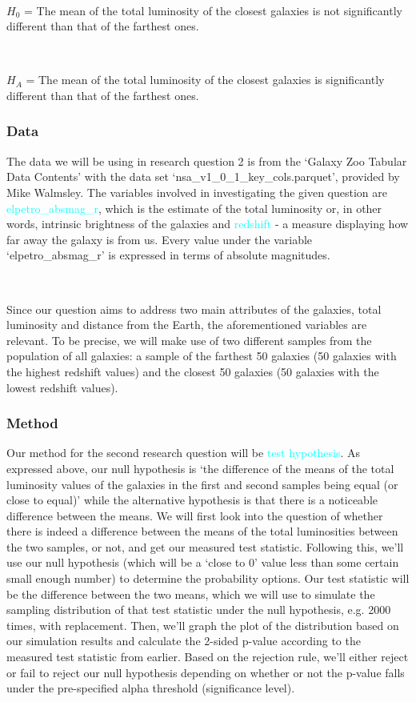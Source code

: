 \documentclass[12pt]{article}
\begin{document}
\

\noindent $H_0$ = The mean of the total luminosity of the closest galaxies is not significantly different than that of the farthest ones.

\

\noindent $H_A$ = The mean of the total luminosity of the closest galaxies is significantly different than that of the farthest ones.

\subsubsection{Data}

The data we will be using in research question 2 is from the `Galaxy Zoo Tabular Data Contents' with the data set `nsa\_v1\_0\_1\_key\_cols.parquet', provided by Mike Walmsley. The variables involved in investigating the given question are \textcolor{cyan}{elpetro\_absmag\_r}, which is the estimate of the total luminosity or, in other words, intrinsic brightness of the galaxies and \textcolor{cyan}{redshift} - a measure displaying how far away the galaxy is from us. Every value under the variable `elpetro\_absmag\_r' is expressed in terms of absolute magnitudes. 

\

\noindent Since our question aims to address two main attributes of the galaxies, total luminosity and distance from the Earth, the aforementioned variables are relevant. To be  precise, we will make use of two different samples from the population of all galaxies: a sample of the farthest 50 galaxies (50 galaxies with the highest redshift values) and the closest 50 galaxies (50 galaxies with the lowest redshift values).

\subsubsection{Method}

Our method for the second research question will be \textcolor{cyan}{test hypothesis}. As expressed above, our null hypothesis is `the difference of the means of the total luminosity values of the galaxies in the first and second samples being equal (or close to equal)' while the alternative hypothesis is that there is a noticeable difference between the means. We will first look into the question of whether there is indeed a difference between the means of the total luminosities between the two samples, or not, and get our measured test statistic. Following this, we'll use our null hypothesis (which will be a `close to 0' value less than some certain small enough number) to determine the probability options. Our test statistic will be the difference between the two means, which we will use to simulate the sampling distribution of that test statistic under the null hypothesis, e.g. 2000 times, with replacement. Then, we'll graph the plot of the distribution based on our simulation results and calculate the 2-sided p-value according to the measured test statistic from earlier. Based on the rejection rule, we'll either reject or fail to reject our null hypothesis depending on whether or not the p-value falls under the pre-specified alpha threshold (significance level). 
\end{document}
